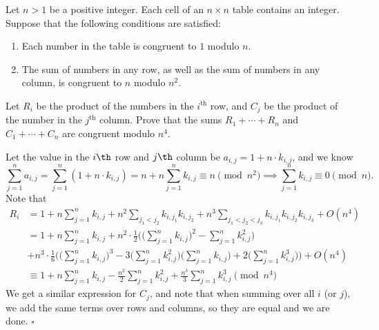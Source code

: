 
\begin{problem}[ISL 2018 N2]
    Let $n>1$ be a positive integer. Each cell of an $n\times n$ table contains an integer. Suppose that the following conditions are satisfied:
    \begin{enumerate}
          \item Each number in the table is congruent to $1$ modulo $n$.
          \item The sum of numbers in any row, as well as the sum of numbers in any column, is congruent to $n$ modulo $n^2$.
    \end{enumerate}
    Let $R_i$ be the product of the numbers in the $i^{\text{th}}$ row, and $C_j$ be the product of the number in the $j^{\text{th}}$ column. Prove that the sums $R_1 + \cdots + R_n$ and $C_1 + \cdots + C_n$ are congruent modulo $n^4$.
\end{problem}

\begin{solution}
    Let the value in the $i\th$ row and $j\th$ column be $a_{i,j} = 1 + n \cdot k_{i,j}$, and we know \[\sum_{j=1}^n a_{i,j} = \sum_{j=1}^n (1 + n \cdot k_{i,j}) = n + n \sum_{j=1}^n k_{i,j} \equiv n\!\!\!\! \pmod{n^2} \implies \sum_{j=1}^n k_{i,j} \equiv 0\!\!\!\! \pmod n.\] Note that \begin{align*}
        R_i &= 1 + n \sum_{j=1}^n k_{i,j} + n^2 \sum_{j_1<j_2} k_{i,j_1}k_{i,j_2} + n^3 \sum_{j_1<j_2<j_3} k_{i,j_1}k_{i,j_2}k_{i,j_3} + O(n^4)\\
        &= 1 + n\sum_{j=1}^nk_{i,j} + n^2 \cdot \frac12\bigg(\bigg(\sum_{j=1}^nk_{i,j}\bigg)^2 - \sum_{j=1}^nk_{i,j}^2\bigg)\\
        &+ n^3 \cdot \frac16\bigg(\bigg(\sum_{j=1}^nk_{i,j}\bigg)^3 - 3\bigg(\sum_{j=1}^nk_{i,j}^2\bigg)\bigg(\sum_{j=1}^nk_{i,j}\bigg) + 2\bigg(\sum_{j=1}^nk_{i,j}^3\bigg)\bigg) + O(n^4)\\
        &\equiv 1 + n\sum_{j=1}^nk_{i,j} - \frac{n^2}{2}\sum_{j=1}^n k_{i,j}^2 + \frac{n^3}{3}\sum_{j=1}^n k_{i,j}^3 \pmod{n^4}
    \end{align*}
    We get a similar expression for $C_j$, and note that when summing over all $i$ (or $j$), we add the same terms over rows and columns, so they are equal and we are done. $\square$
\end{solution}
